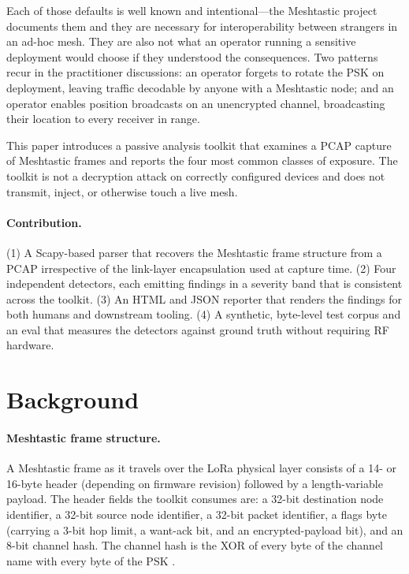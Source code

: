 \documentclass[conference,a4paper,10pt]{IEEEtran}
\begin{document}
Each of those defaults is well known and intentional---the
Meshtastic project documents them and they are necessary for
interoperability between strangers in an ad-hoc mesh. They are also
not what an operator running a sensitive deployment would choose if
they understood the consequences. Two patterns recur in the
practitioner discussions: an operator forgets to rotate the PSK on
deployment, leaving traffic decodable by anyone with a Meshtastic
node; and an operator enables position broadcasts on an unencrypted
channel, broadcasting their location to every receiver in range.

This paper introduces a passive analysis toolkit that examines a
PCAP capture of Meshtastic frames and reports the four most common
classes of exposure. The toolkit is not a decryption attack on
correctly configured devices and does not transmit, inject, or
otherwise touch a live mesh.

\paragraph{Contribution.}
(1) A Scapy-based parser that recovers the Meshtastic frame structure
from a PCAP irrespective of the link-layer encapsulation used at
capture time. (2) Four independent detectors, each emitting findings
in a severity band that is consistent across the toolkit. (3) An HTML
and JSON reporter that renders the findings for both humans and
downstream tooling. (4) A synthetic, byte-level test corpus and an
eval that measures the detectors against ground truth without
requiring RF hardware.

\section{Background}

\paragraph{Meshtastic frame structure.}
A Meshtastic frame as it travels over the LoRa physical layer
\cite{lora_phy} consists of a 14- or 16-byte header (depending on
firmware revision) followed by a length-variable payload. The header
fields the toolkit consumes are: a 32-bit destination node
identifier, a 32-bit source node identifier, a 32-bit packet
identifier, a flags byte (carrying a 3-bit hop limit, a want-ack
bit, and an encrypted-payload bit), and an 8-bit channel hash. The
channel hash is the XOR of every byte of the channel name with every
byte of the PSK \cite{meshtastic_docs}.
\end{document}
